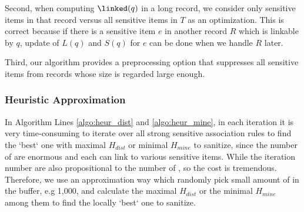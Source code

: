  Second, when computing
$\linked(q)$ in a long record, we consider only sensitive items in that
record versus all sensitive items in $T$ as an optimization. This is correct
because if there is a sensitive item $e$ in another record $R$ which is
linkable by $q$, update of $L(q)$ and $S(q)$ for $e$ can be done when we
handle $R$ later.

 Third, our algorithm provides a preprocessing option that
suppresses all sensitive items from records whose size is regarded large
enough.
%
%
\subsubsection{Heuristic Approximation}
In Algorithm \SanitizeBuffer Lines \ref{algo:heur_dist} and
\ref{algo:heur_mine}, in each iteration it is very time-consuming to iterate
over all strong sensitive association rules to find the `best` one with
maximal $H_{dist}$ or minimal $H_{mine}$ to sanitize, since the number of
\qids are enormous and each \qid can link to various sensitive items.
While the iteration number are also propositional to the number of \qids, so
the cost is tremendous. Therefore, we use an approximation way which randomly
pick small amount of \qids in the buffer, e.g 1,000, and calculate the
maximal $H_{dist}$ or the minimal $H_{mine}$ among them to find the locally
`best` one to sanitize.
%

